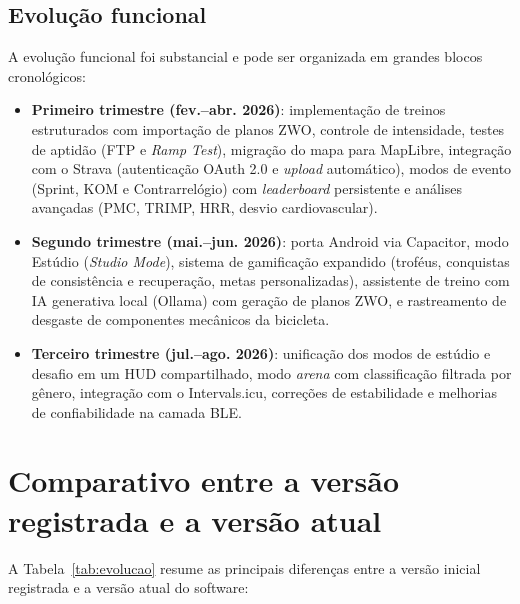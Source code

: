\subsection{Evolução funcional}
\label{sec:evolucao-funcional}

A evolução funcional foi substancial e pode ser organizada em grandes blocos
cronológicos:

\begin{itemize}
    \item \textbf{Primeiro trimestre (fev.--abr. 2026)}: implementação de
        treinos estruturados com importação de planos ZWO, controle de
        intensidade, testes de aptidão (FTP e \textit{Ramp Test}), migração do
        mapa para MapLibre, integração com o Strava (autenticação OAuth 2.0 e
        \textit{upload} automático), modos de evento (Sprint, KOM e
        Contrarrelógio) com \textit{leaderboard} persistente e análises
        avançadas (PMC, TRIMP, HRR, desvio cardiovascular).
    \item \textbf{Segundo trimestre (mai.--jun. 2026)}: porta Android via
        Capacitor, modo Estúdio (\textit{Studio Mode}), sistema de
        gamificação expandido (troféus, conquistas de consistência e
        recuperação, metas personalizadas), assistente de treino com IA
        generativa local (Ollama) com geração de planos ZWO, e rastreamento de
        desgaste de componentes mecânicos da bicicleta.
    \item \textbf{Terceiro trimestre (jul.--ago. 2026)}: unificação dos modos de
        estúdio e desafio em um HUD compartilhado, modo \textit{arena} com
        classificação filtrada por gênero, integração com o Intervals.icu,
        correções de estabilidade e melhorias de confiabilidade na camada BLE.
\end{itemize}

\section{Comparativo entre a versão registrada e a versão atual}
\label{sec:comparativo}

A Tabela~\ref{tab:evolucao} resume as principais diferenças entre a versão
inicial registrada e a versão atual do software:

